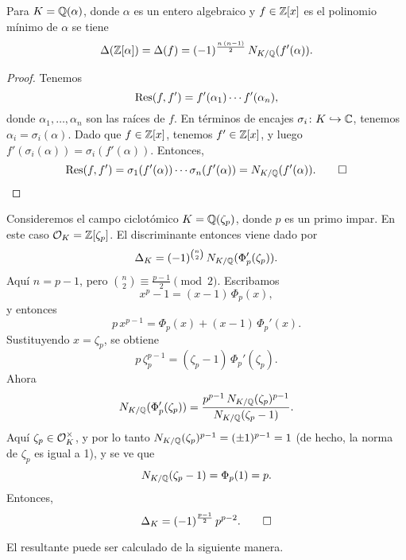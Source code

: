 \begin{corolario}
  Para $K = \mathbb{Q} (\alpha)$, donde $\alpha$ es un entero algebraico y
  $f \in \mathbb{Z} [x]$ es el polinomio mínimo de $\alpha$ se tiene
  \[ \Delta (\mathbb{Z} [\alpha]) = \Delta (f)
     = (-1)^{\frac{n\,(n-1)}{2}}\,N_{K/\mathbb{Q}} (f' (\alpha)). \]

  \begin{proof}
    Tenemos
    $$\operatorname{Res} (f,f') = f' (\alpha_1) \cdots f' (\alpha_n),$$
    donde $\alpha_1,\ldots,\alpha_n$ son las raíces de $f$. En términos de
    encajes $\sigma_i\colon K\hookrightarrow \mathbb{C}$, tenemos
    $\alpha_i = \sigma_i (\alpha)$. Dado que $f \in \mathbb{Z} [x]$, tenemos
    $f' \in \mathbb{Z} [x]$, y luego $f' (\sigma_i (\alpha)) = \sigma_i (f' (\alpha))$.
    Entonces,
    \[ \operatorname{Res} (f,f') = \sigma_1 (f' (\alpha)) \cdots \sigma_n (f' (\alpha)) =
       N_{K/\mathbb{Q}} (f' (\alpha)). \qedhere \]
  \end{proof}
\end{corolario}

\begin{ejemplo}
  \label{ejemplo:discriminante-de-Q-zeta-p}
  Consideremos el campo ciclotómico $K = \mathbb{Q} (\zeta_p)$, donde $p$ es un primo
  impar. En este caso $\mathcal{O}_K = \mathbb{Z} [\zeta_p]$. El discriminante entonces viene
  dado por
  $$\Delta_K = (-1)^{{n \choose 2}}\,N_{K/\mathbb{Q}} (\Phi_p' (\zeta_p)).$$
  Aquí $n = p-1$, pero ${n \choose 2} \equiv \frac{p-1}{2} \pmod{2}$.
  Escribamos
  $$x^p - 1 = (x-1)\,\Phi_p (x),$$
  y entonces
  $$p\,x^{p-1} = \Phi_p (x) + (x-1)\,\Phi_p' (x).$$
  Sustituyendo $x = \zeta_p$, se obtiene
  $$p\,\zeta_p^{p-1} = (\zeta_p - 1)\,\Phi_p' (\zeta_p).$$
  Ahora
  \[ N_{K/\mathbb{Q}} (\Phi_p' (\zeta_p)) =
     \frac{p^{p-1} \, N_{K/\mathbb{Q}} (\zeta_p)^{p-1}}{N_{K/\mathbb{Q}} (\zeta_p - 1)}. \]
  Aquí $\zeta_p \in \mathcal{O}_K^\times$, y por lo tanto
  $N_{K/\mathbb{Q}} (\zeta_p)^{p-1} = (\pm 1)^{p-1} = 1$
  (de hecho, la norma de $\zeta_p$ es igual a 1), y se ve que
  $$N_{K/\mathbb{Q}} (\zeta_p - 1) = \Phi_p (1) = p.$$
  Entonces,
  \[ \Delta_K = (-1)^{\frac{p-1}{2}} \, p^{p-2}. \qedhere \]
\end{ejemplo}

El resultante puede ser calculado de la siguiente manera.


